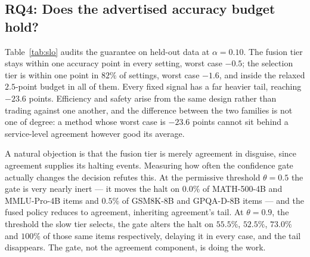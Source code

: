 \documentclass[acmsmall]{acmart}
\theoremstyle{acmdefinition}%
\theoremstyle{acmplain}}{}%
\begin{document}
\subsection{RQ4: Does the advertised accuracy budget hold?}\label{sec:rq4}
Table~\ref{tab:slo} audits the guarantee on held-out data at $\alpha=0.10$. The fusion tier stays within one accuracy point in every setting, worst case $-0.5$; the selection tier is within one point in $82\%$ of settings, worst case $-1.6$, and inside the relaxed $2.5$-point budget in all of them. Every fixed signal has a far heavier tail, reaching $-23.6$ points. Efficiency and safety arise from the same design rather than trading against one another, and the difference between the two families is not one of degree: a method whose worst case is $-23.6$ points cannot sit behind a service-level agreement however good its average.

A natural objection is that the fusion tier is merely agreement in disguise, since agreement supplies its halting events. Measuring how often the confidence gate actually changes the decision refutes this. At the permissive threshold $\theta=0.5$ the gate is very nearly inert --- it moves the halt on $0.0\%$ of MATH-500-4B and MMLU-Pro-4B items and $0.5\%$ of GSM8K-8B and GPQA-D-8B items --- and the fused policy reduces to agreement, inheriting agreement's tail. At $\theta=0.9$, the threshold the slow tier selects, the gate alters the halt on $55.5\%$, $52.5\%$, $73.0\%$ and $100\%$ of those same items respectively, delaying it in every case, and the tail disappears. The gate, not the agreement component, is doing the work.
\end{document}
